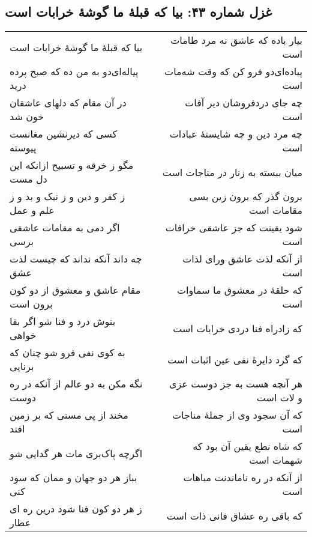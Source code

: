 \begin{center}
\section*{غزل شماره ۴۳: بیا که قبلهٔ ما گوشهٔ خرابات است}
\label{sec:043}
\begin{longtable}{l p{0.5cm} r}
بیا که قبلهٔ ما گوشهٔ خرابات است
&&
بیار باده که عاشق نه مرد طامات است
\\
پیاله‌ای‌دو به من ده که صبح پرده درید
&&
پیاده‌ای‌دو فرو کن که وقت شه‌مات است
\\
در آن مقام که دلهای عاشقان خون شد
&&
چه جای دردفروشان دیر آفات است
\\
کسی که دیرنشین مغانست پیوسته
&&
چه مرد دین و چه شایستهٔ عبادات است
\\
مگو ز خرقه و تسبیح ازانکه این دل مست
&&
میان ببسته به زنار در مناجات است
\\
ز کفر و دین و ز نیک و بد و ز علم و عمل
&&
برون گذر که برون زین بسی مقامات است
\\
اگر دمی به مقامات عاشقی برسی
&&
شود یقینت که جز عاشقی خرافات است
\\
چه داند آنکه نداند که چیست لذت عشق
&&
از آنکه لذت عاشق ورای لذات است
\\
مقام عاشق و معشوق از دو کون برون است
&&
که حلقهٔ در معشوق ما سماوات است
\\
بنوش درد و فنا شو اگر بقا خواهی
&&
که زادراه فنا دردی خرابات است
\\
به کوی نفی فرو شو چنان که برنایی
&&
که گرد دایرهٔ نفی عین اثبات است
\\
نگه مکن به دو عالم از آنکه در ره دوست
&&
هر آنچه هست به جز دوست عزی و لات است
\\
مخند از پی مستی که بر زمین افتد
&&
که آن سجود وی از جملهٔ مناجات است
\\
اگرچه پاک‌بری مات هر گدایی شو
&&
که شاه نطع یقین آن بود که شهمات است
\\
بباز هر دو جهان و ممان که سود کنی
&&
از آنکه در ره ناماندنت مباهات است
\\
ز هر دو کون فنا شود درین ره ای عطار
&&
که باقی ره عشاق فانی ذات است
\\
\end{longtable}
\end{center}

